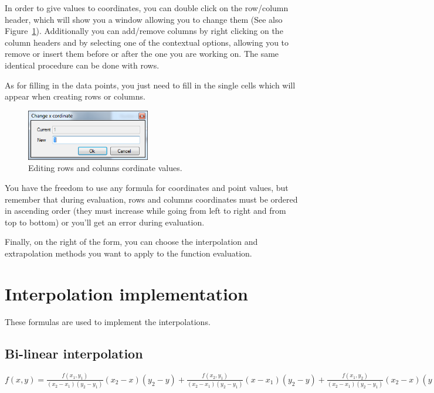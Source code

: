 In order to give values to coordinates, you can double click on the row/column header, which will show you a window allowing you to change them (See also Figure~\ref{fig.PFunction2DColumnEdit}). Additionally you can add/remove columns by right clicking on the column headers and by selecting one of the contextual options, allowing you to remove or insert them before or after the one you are working on. The same identical procedure can be done with rows.

As for filling in the data points, you just need to fill in the single cells which will appear when creating rows or columns.

\begin{figure}[ht]
\begin{center}
\includegraphics[width=0.48\textwidth]{./images/PFunction2DColumnEdit.png}
\caption{Editing rows and colunns cordinate values.}
\label{fig.PFunction2DColumnEdit}
\end{center}
\end{figure}

You have the freedom to use any formula for coordinates and point values, but remember that during evaluation, rows and columns coordinates must be ordered in ascending order (they must increase while going from left to right and from top to bottom) or you'll get an error during evaluation.

Finally, on the right of the form, you can choose the interpolation and extrapolation methods you want to apply to the function evaluation.
\section{Interpolation implementation}
These formulas are used to implement the interpolations.
\subsection{Bi-linear interpolation}
$f(x, y) = \frac{f(x_1, y_1)}{(x_2 - x_1)(y_2 - y_1)}(x_2 - x)(y_2 - y) + \frac{f(x_2, y_1)}{(x_2 - x_1)(y_2 - y_1)}(x - x_1)(y_2 - y) + \frac{f(x_1, y_2)}{(x_2 - x_1)(y_2 - y_1)}(x_2 - x)(y - y_1) + \frac{f(x_2, y_2)}{(x_2 - x_1)(y_2 - y_1)}(x - x_1)(y - y_1)$

